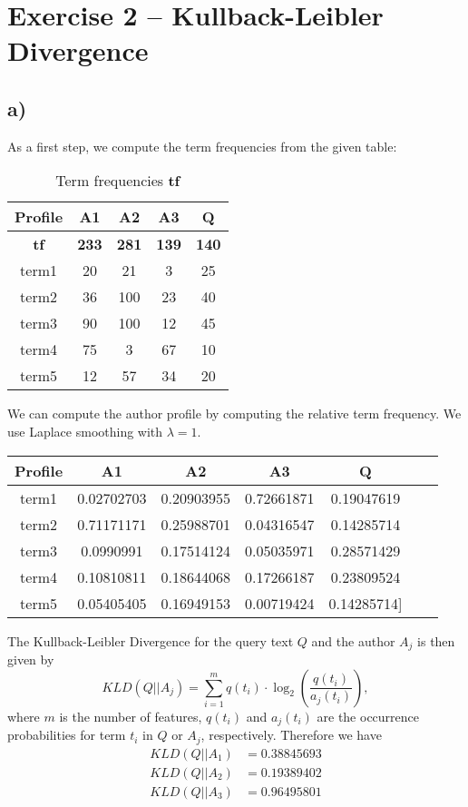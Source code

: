 \documentclass[a4paper]{article}
\begin{document}
\section*{Exercise 2 -- Kullback-Leibler Divergence}
\subsection*{a)}
As a first step, we compute the term frequencies from the given table:
\begin{table}[h]
\centering
\begin{tabular}{| c | c | c | c | c |}
\hline
\textbf{Profile} & \textbf{A1} & \textbf{A2} & \textbf{A3} & \textbf{Q} \\ \hline
\textbf{tf} & \textbf{233} & \textbf{281} & \textbf{139} & \textbf{140} \\ \hline
term1 & 20 & 21 & 3 & 25\\ \hline
term2 & 36 & 100 & 23 & 40\\ \hline
term3 & 90 & 100 & 12 & 45 \\ \hline
term4 & 75 & 3 & 67 & 10 \\ \hline
term5 & 12 & 57 & 34 & 20 \\ \hline
\end{tabular}
\caption{Term frequencies \textbf{tf}}
\end{table}

\noindent We can compute the author profile by computing the relative term frequency. We use Laplace smoothing with $\lambda = 1$.
\begin{table}[h]
\centering
\begin{tabular}{| c | c | c | c | c | c | c |}
\hline
\textbf{Profile} & \textbf{A1} & \textbf{A2} & \textbf{A3} & \textbf{Q} \\ \hline
term1 &0.02702703  & 0.20903955  & 0.72661871 & 0.19047619  \\
term2 &0.71171171 & 0.25988701 & 0.04316547 & 0.14285714 \\
term3 &0.0990991  & 0.17514124 & 0.05035971 & 0.28571429 \\
term4 &0.10810811 & 0.18644068 & 0.17266187 & 0.23809524 \\
term5 &0.05405405 & 0.16949153 & 0.00719424 & 0.14285714] \\ \hline
\end{tabular}
\end{table}

The Kullback-Leibler Divergence for the query text $Q$ and the author $A_j$ is then given by
$$KLD(Q || A_j) = \sum_{i=1}^m q(t_i) \cdot \log_2 \left( \frac{q(t_i)}{a_j(t_i)} \right),$$
where $m$ is the number of features, $q(t_i)$ and $a_j(t_i)$ are the occurrence probabilities for term $t_i$ in $Q$ or $A_j$, respectively. Therefore we have
\begin{align*}
KLD(Q || A_1) &=  0.38845693 \\
KLD(Q || A_2) &=  0.19389402 \\
KLD(Q || A_3) &=  0.96495801 
\end{align*}
\end{document}

